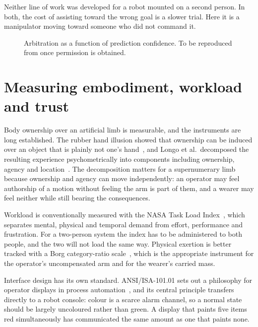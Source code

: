 Neither line of work was developed for a robot mounted on a second person. In
both, the cost of assisting toward the wrong goal is a slower trial. Here it
is a manipulator moving toward someone who did not command it.

\begin{figure}[htbp]
  \centering
  \caption[Policy blending arbitration (reproduced)]{Arbitration as a function
  of prediction confidence. To be reproduced from
  \cite{dragan2013policyblending} once permission is obtained.}
  \label{fig:repro-blending}
\end{figure}

\section{Measuring embodiment, workload and trust}

Body ownership over an artificial limb is measurable, and the instruments are
long established. The rubber hand illusion showed that ownership can be
induced over an object that is plainly not one's
hand~\cite{botvinick1998rubber}, and Longo et al.\ decomposed the resulting
experience psychometrically into components including ownership, agency and
location~\cite{longo2008embodiment}. The decomposition matters for a
supernumerary limb because ownership and agency can move independently: an
operator may feel authorship of a motion without feeling the arm is part of
them, and a wearer may feel neither while still bearing the consequences.

Workload is conventionally measured with the NASA Task Load
Index~\cite{hart1988nasatlx}, which separates mental, physical and temporal
demand from effort, performance and frustration. For a two-person system the
index has to be administered to both people, and the two will not load the
same way. Physical exertion is better tracked with a Borg category-ratio
scale~\cite{borg1982perceived}, which is the appropriate instrument for the
operator's uncompensated arm and for the wearer's carried mass.

Interface design has its own standard. ANSI/ISA-101.01 sets out a philosophy
for operator displays in process
automation~\cite{isa101}, and its central principle transfers directly to a
robot console: colour is a scarce alarm channel, so a normal state should be
largely uncoloured rather than green. A display that paints five items red
simultaneously has communicated the same amount as one that paints none.

